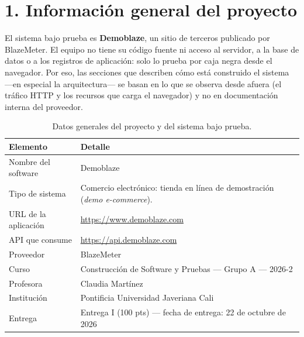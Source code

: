 
\FloatBarrier
\section*{1. Información general del proyecto}

El sistema bajo prueba es \textbf{Demoblaze}, un sitio de terceros publicado por
BlazeMeter. El equipo no tiene su código fuente ni acceso al servidor, a la base de
datos o a los registros de aplicación: solo lo prueba por caja negra desde el
navegador. Por eso, las secciones que describen cómo está construido el sistema —en
especial la arquitectura— se basan en lo que se observa desde afuera (el tráfico HTTP
y los recursos que carga el navegador) y no en documentación interna del proveedor.

\begingroup
\small
\renewcommand{\arraystretch}{1.25}
\begin{table}[htb]\centering\small
\caption{Datos generales del proyecto y del sistema bajo prueba.}\label{tab:info-general}
\begin{tabularx}{\textwidth}{@{}L{4.4cm} Y@{}}
\toprule
\textbf{Elemento} & \textbf{Detalle} \\
\midrule
Nombre del software & Demoblaze \\
Tipo de sistema & Comercio electrónico: tienda en línea de demostración (\emph{demo e-commerce}). \\
URL de la aplicación & \url{https://www.demoblaze.com} \\
API que consume & \url{https://api.demoblaze.com} \\
Proveedor & BlazeMeter \\
Curso & Construcción de Software y Pruebas — Grupo A — 2026-2 \\
Profesora & Claudia Martínez \\
Institución & Pontificia Universidad Javeriana Cali \\
Entrega & Entrega I (100 pts) — fecha de entrega: 22 de octubre de 2026 \\
\bottomrule
\end{tabularx}
\end{table}
\endgroup

